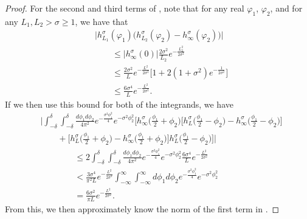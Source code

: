 \documentclass[../thesis-main/thesis-main]{subfiles}
\begin{document}
\begin{proof}
For the second and third terms of , note that for any real $\varphi_1$, $\varphi_2$, and for any $L_1,L_2 > \sigma \geq 1$, we have that
\begin{align}
  &\Big| h_{L_1}^\sigma(\varphi_1) \big(h_{L_2}^\sigma(\varphi_2) - h_\infty^\sigma(\varphi_2) \big) \Big| \nonumber\\
  &\qquad\leq \big| h_\infty^\sigma(0)\big| \frac{2\sigma^2}{L_2} e^{-\frac{L_2^2}{2\sigma^2}}\\
   & \qquad \leq  \frac{2 \sigma^2}{L} e^{-\frac{L^2}{2\sigma^2} }\Big [ 1 + 2 (1 + \sigma^2) e^{ -\frac{1}{2\sigma^2}}\Big]\\
   & \qquad \leq \frac{6 \sigma^4}{L}  e^{ - \frac{L^2}{2\sigma^2}}.
\end{align}
If we then use this bound for both of the integrands, we have 
\begin{align}
  &\Bigg | \int_{-\delta}^\delta \int_{-\delta}^\delta \frac{d\phi_1 d\phi_2}{4\pi^2} e^{- \frac{\sigma^2 \phi_1^2}{4}}e^{-\sigma^2 \phi_2^2}  \Big[h_\infty^\sigma\Big(\frac{\phi_1}{2} + \phi_2\Big)\bigg[h_L^\sigma\Big(\frac{\phi_1}{2} - \phi_2\Big) - h_\infty^\sigma\Big(\frac{\phi_1}{2} - \phi_2\Big)\bigg]\nonumber\\
  &\qquad + \bigg[h_L^\sigma\Big(\frac{\phi_1}{2} + \phi_2\Big) - h_\infty^\sigma\Big(\frac{\phi_1}{2} + \phi_2\Big)\bigg]h_L^\sigma\Big(\frac{\phi_1}{2} - \phi_2\Big)\bigg]\Bigg|\nonumber\\
  &\qquad \qquad \leq  2\int_{-\delta}^\delta \int_{-\delta}^\delta \frac{d\phi_1 d\phi_2}{4\pi^2} e^{- \frac{\sigma^2 \phi_1^2}{4}}e^{-\sigma^2 \phi_2^2}  \frac{6 \sigma^4}{L}  e^{-\frac{L^2}{2\sigma^2}}\\
  & \qquad\qquad < \frac{3\sigma^4}{\pi^2 L}  e^{ - \frac{ L^2}{2\sigma^2}}\int_{-\infty}^\infty \int_{-\infty}^\infty  d\phi_1 d\phi_2 e^{- \frac{\sigma^2 \phi_1^2}{4}}e^{-\sigma^2 \phi_2^2}\\
  & \qquad\qquad = \frac{ 6\sigma^2}{\pi L}  e^{ - \frac{L^2}{2\sigma^2}}.
\end{align}
From this, we then approximately know the norm of the first term in .


\end{proof}
\end{document}
